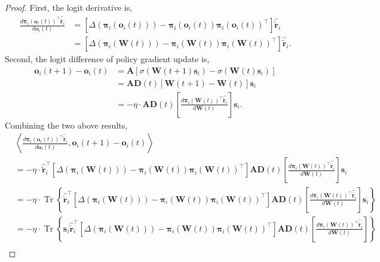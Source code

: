\documentclass[10pt]{article}
\def\rvo{{\mathbf{o}}}
\def\rvs{{\mathbf{s}}}
\def\rvo{{\mathbf{o}}}
\def\rvtilder{{\tilde{\mathbf{r}}}}
\def\rvpi{{\boldsymbol{\pi}}}
\def\rmA{{\mathbf{A}}}
\def\rmD{{\mathbf{D}}}
\def\rmW{{\mathbf{W}}}
\DeclareMathOperator*{\trace}{Tr}
\begin{document}
\begin{proof}
    First, the logit derivative is,
\begin{equation*}
\begin{split}
    \frac{d \rvpi_i\left( \rvo_i(t) \right)^\top \hat{\rvtilder}_i}{d \rvo_i(t)} &= \left[\Delta\left( \rvpi_i\left( \rvo_i(t) \right) \right) - \rvpi_i\left( \rvo_i(t) \right) \rvpi_i\left( \rvo_i(t) \right)^\top \right] \hat{\rvtilder}_i \\
    &= \left[\Delta\left( \rvpi_i\left( \rmW(t) \right) \right) - \rvpi_i\left( \rmW(t) \right) \rvpi_i\left( \rmW(t) \right)^\top \right] \hat{\rvtilder}_i.
\end{split}
\end{equation*}
Second, the logit difference of policy gradient update is,
\begin{equation*}
\begin{split}
    \rvo_i(t+1) - \rvo_i(t) &= \rmA \left[ \sigma\left(\rmW(t+1) \rvs_i \right) - \sigma\left( \rmW(t) \rvs_i \right)\right] \\
    &= \rmA \rmD(t) \left[ \rmW(t+1) - \rmW(t) \right] \rvs_i \\
    &= - \eta \cdot \rmA \rmD(t) \left[ \frac{d \rvpi_i\left(\rmW(t)\right)^\top \hat{\rvtilder}_i}{d \rmW(t)} \right] \rvs_i.
\end{split}
\end{equation*}
Combining the two above results,
\begin{equation*}
\begin{split}
    &\left\langle \frac{d \rvpi_i\left( \rvo_i(t) \right)^\top \hat{\rvtilder}_i}{d \rvo_i(t)}, \rvo_i(t+1) - \rvo_i(t) \right\rangle \\
    &= - \eta \cdot \hat{\rvtilder}_i^\top \left[\Delta\left( \rvpi_i\left( \rmW(t) \right) \right) - \rvpi_i\left( \rmW(t) \right) \rvpi_i\left( \rmW(t) \right)^\top \right] \rmA \rmD(t) \left[ \frac{d \rvpi_i\left(\rmW(t)\right)^\top \hat{\rvtilder}_i}{d \rmW(t)} \right] \rvs_i \\
    &= - \eta \cdot \trace \left\{ \hat{\rvtilder}_i^\top \left[\Delta\left( \rvpi_i\left( \rmW(t) \right) \right) - \rvpi_i\left( \rmW(t) \right) \rvpi_i\left( \rmW(t) \right)^\top \right] \rmA \rmD(t) \left[ \frac{d \rvpi_i\left(\rmW(t)\right)^\top \hat{\rvtilder}_i}{d \rmW(t)} \right] \rvs_i \right\} \\
    &= - \eta \cdot \trace \left\{ \rvs_i \hat{\rvtilder}_i^\top \left[\Delta\left( \rvpi_i\left( \rmW(t) \right) \right) - \rvpi_i\left( \rmW(t) \right) \rvpi_i\left( \rmW(t) \right)^\top \right] \rmA \rmD(t) \left[ \frac{d \rvpi_i\left(\rmW(t)\right)^\top \hat{\rvtilder}_i}{d \rmW(t)} \right]  \right\} \\

\end{split}
\end{equation*}
\end{proof}
\end{document}
